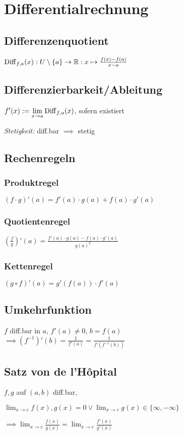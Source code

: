 \section*{Differentialrechnung}

\subsection*{Differenzenquotient}
$\operatorname{Diff}_{f,a}(x): U\setminus\{a\}\to\mathbb{R}: x\mapsto\frac{f(x)-f(a)}{x-a}$

\subsection*{Differenzierbarkeit/Ableitung}
$\displaystyle f'(x) := \lim_{x\to a}\operatorname{Diff}_{f,a}(x)$, sofern existiert

\textit{Stetigkeit:} diff.bar $\implies$ stetig

\subsection*{Rechenregeln}

\subsubsection*{Produktregel}
$(f \cdot g)'(a)=f'(a)\cdot g(a)+f(a)\cdot g'(a)$

\subsubsection*{Quotientenregel}
$\left(\frac{f}{g}\right)'(a)=\frac{f'(a)\cdot g(a) - f(a)\cdot g'(a)}{g(a)^2}$

\subsubsection*{Kettenregel}
$(g\circ f)'(a) = g'(f(a))\cdot f'(a)$

\subsection*{Umkehrfunktion}
$f$ diff.bar in $a$, $f'(a)\neq0$, $b=f(a)$ \\
$\implies (f^{-1})'(b) = \frac{1}{f'(a)}=\frac{1}{f'(f^{-1}(b))}$

\subsection*{Satz von de l'H\^opital}
$f,g$ auf $(a,b)$ diff.bar,

$\displaystyle \lim_{x\to c}f(x),g(x)=0 \lor
\lim_{x\to c}g(x)\in\{\infty,-\infty\}$

$\displaystyle \implies \lim_{x\to c}\frac{f(x)}{g(x)}=\lim_{x\to c}\frac{f'(x)}{g'(x)}$
